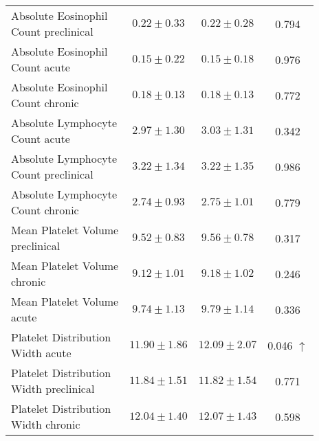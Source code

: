 \begin{table}[htbp]
\begin{tabular}{lccc}
\makecell[l]{Absolute Eosinophil \\ Count preclinical} & $0.22 \pm 0.33$ & $0.22 \pm 0.28$ & 0.794  \\

\makecell[l]{Absolute Eosinophil \\ Count acute} & $0.15 \pm 0.22$ & $0.15 \pm 0.18$ & 0.976  \\

\makecell[l]{Absolute Eosinophil \\ Count chronic} & $0.18 \pm 0.13$ & $0.18 \pm 0.13$ & 0.772  \\

\makecell[l]{Absolute Lymphocyte \\ Count acute} & $2.97 \pm 1.30$ & $3.03 \pm 1.31$ & 0.342  \\

\makecell[l]{Absolute Lymphocyte \\ Count preclinical} & $3.22 \pm 1.34$ & $3.22 \pm 1.35$ & 0.986  \\

\makecell[l]{Absolute Lymphocyte \\ Count chronic} & $2.74 \pm 0.93$ & $2.75 \pm 1.01$ & 0.779  \\

\makecell[l]{Mean Platelet Volume \\ preclinical} & $9.52 \pm 0.83$ & $9.56 \pm 0.78$ & 0.317  \\

\makecell[l]{Mean Platelet Volume \\ chronic} & $9.12 \pm 1.01$ & $9.18 \pm 1.02$ & 0.246  \\

\makecell[l]{Mean Platelet Volume \\ acute} & $9.74 \pm 1.13$ & $9.79 \pm 1.14$ & 0.336  \\

\makecell[l]{Platelet Distribution \\ Width acute} & $11.90 \pm 1.86$ & $12.09 \pm 2.07$ & 0.046 $\uparrow$ \\

\makecell[l]{Platelet Distribution \\ Width preclinical} & $11.84 \pm 1.51$ & $11.82 \pm 1.54$ & 0.771  \\

\makecell[l]{Platelet Distribution \\ Width chronic} & $12.04 \pm 1.40$ & $12.07 \pm 1.43$ & 0.598  \\


\end{tabular}
\end{table}

